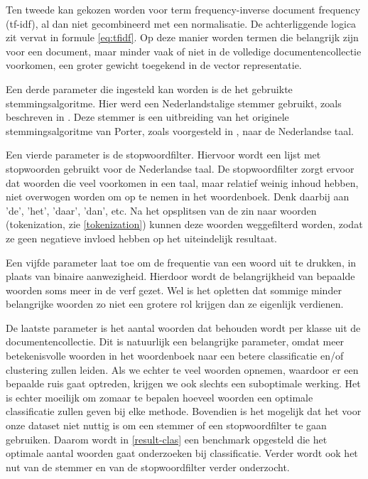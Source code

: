 Ten tweede kan gekozen worden voor term frequency-inverse document frequency (tf-idf), al dan niet gecombineerd met een normalisatie. De achterliggende logica zit vervat in formule \ref{eq:tfidf}. Op deze manier worden termen die belangrijk zijn voor een document, maar minder vaak of niet in de volledige documentencollectie voorkomen, een groter gewicht toegekend in de vector representatie. 

Een derde parameter die ingesteld kan worden is de het gebruikte stemmingsalgoritme. Hier werd een Nederlandstalige stemmer gebruikt, zoals beschreven in \cite{Kraaij1994}. Deze stemmer is een uitbreiding van het originele stemmingsalgoritme van Porter, zoals voorgesteld in \cite{Porter1980}, naar de Nederlandse taal. 

Een vierde parameter is de stopwoordfilter. Hiervoor wordt een lijst met stopwoorden gebruikt voor de Nederlandse taal. De stopwoordfilter zorgt ervoor dat woorden die veel voorkomen in een taal, maar relatief weinig inhoud hebben, niet overwogen worden om op te nemen in het woordenboek. Denk daarbij aan 'de', 'het', 'daar', 'dan', etc. Na het opsplitsen van de zin naar woorden (tokenization, zie \ref{tokenization}) kunnen deze woorden weggefilterd worden, zodat ze geen negatieve invloed hebben op het uiteindelijk resultaat.

Een vijfde parameter laat toe om de frequentie van een woord uit te drukken, in plaats van binaire aanwezigheid. Hierdoor wordt de belangrijkheid van bepaalde woorden soms meer in de verf gezet. Wel is het opletten dat sommige minder belangrijke woorden zo niet een grotere rol krijgen dan ze eigenlijk verdienen.

De laatste parameter is het aantal woorden dat behouden wordt per klasse uit de documentencollectie. Dit is natuurlijk een belangrijke parameter, omdat meer betekenisvolle woorden in het woordenboek naar een betere classificatie en/of clustering zullen leiden. Als we echter te veel woorden opnemen, waardoor er een bepaalde ruis gaat optreden, krijgen we ook slechts een suboptimale werking. Het is echter moeilijk om zomaar te bepalen hoeveel woorden een optimale classificatie zullen geven bij elke methode. Bovendien is het mogelijk dat het voor onze dataset niet nuttig is om een stemmer of een stopwoordfilter te gaan gebruiken. Daarom wordt in \ref{result-clas} een benchmark opgesteld die het optimale aantal woorden gaat onderzoeken bij classificatie. Verder wordt ook het  nut van de stemmer en van de stopwoordfilter verder onderzocht. 

